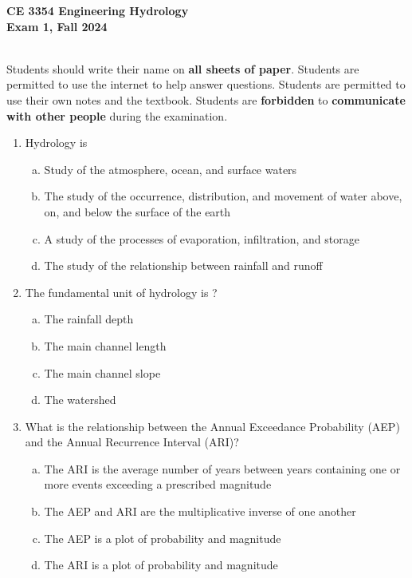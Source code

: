 \documentclass[12pt]{article}
\begin{document}
\begingroup
\begin{centering}
\textbf{CE 3354 Engineering Hydrology} \\
\textbf{Exam 1, Fall 2024}\\
\end{centering}
~\\
Students should write their name on \textbf{all sheets of paper}.  \newline 
Students are permitted to use the internet to help answer questions.  \newline 
Students are permitted to use their own notes and the textbook.\newline 
Students are \textbf{forbidden} to \textbf{communicate with other people} during the examination.
\endgroup
\begin{enumerate}
\item Hydrology is
\begin{enumerate}[a)]
\item Study of the atmosphere, ocean, and surface waters
\item The study of the occurrence, distribution, and movement of water above, on, and below the surface of the earth
\item A study of the processes of evaporation, infiltration, and storage
\item The study of the relationship between rainfall and runoff
\end{enumerate}
\item The fundamental unit of hydrology is ?
\begin{enumerate}[a)]
\item The rainfall depth
\item The main channel length
\item The main channel slope
\item The watershed 
\end{enumerate}
\item What is the relationship between the Annual Exceedance Probability (AEP) and the Annual Recurrence Interval (ARI)?
\begin{enumerate}[a)]
\item	The ARI is the average number of years between years containing one or more events exceeding a prescribed magnitude
\item	The AEP and ARI are the multiplicative inverse of one another
\item	The AEP is a plot of probability and magnitude
\item	The ARI is a plot of probability and magnitude
\end{enumerate}


\end{enumerate}
\end{document}
